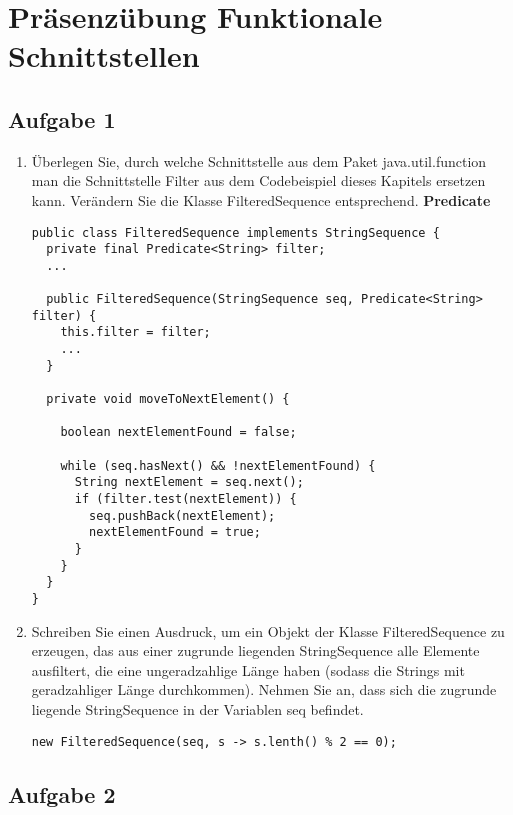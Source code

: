 \chapter{Präsenzübung Funktionale \newline Schnittstellen}

\section{Aufgabe 1}

\begin{enumerate}
    \item Überlegen Sie, durch welche Schnittstelle aus dem Paket java.util.function man die
          Schnittstelle Filter aus dem Codebeispiel dieses Kapitels ersetzen kann.
          Verändern Sie die Klasse FilteredSequence entsprechend. \newline
          \textbf{Predicate}
          \begin{lstlisting}
public class FilteredSequence implements StringSequence {
  private final Predicate<String> filter;
  ...

  public FilteredSequence(StringSequence seq, Predicate<String> filter) {
    this.filter = filter;
    ...
  }

  private void moveToNextElement() {

    boolean nextElementFound = false;

    while (seq.hasNext() && !nextElementFound) {
      String nextElement = seq.next();
      if (filter.test(nextElement)) {
        seq.pushBack(nextElement);
        nextElementFound = true;
      }
    }
  }
}
\end{lstlisting} \pagebreak
    \item Schreiben Sie einen Ausdruck, um ein Objekt der Klasse FilteredSequence zu
          erzeugen, das aus einer zugrunde liegenden StringSequence alle Elemente
          ausfiltert, die eine ungeradzahlige Länge haben (sodass die Strings mit
          geradzahliger Länge durchkommen). Nehmen Sie an, dass sich die zugrunde
          liegende StringSequence in der Variablen seq befindet.
          \begin{lstlisting}
new FilteredSequence(seq, s -> s.lenth() % 2 == 0);
\end{lstlisting}
\end{enumerate}

\section{Aufgabe 2}

